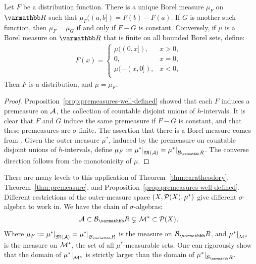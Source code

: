    \begin{theorem}
        Let $F$ be a distribution function. There is a unique Borel measure $\mu_F$ on $\bfR$ such that $\mu_F((a,b]) = F(b) - F(a)$. If $G$ is another such function, then $\mu_F = \mu_G$ if and only if $F-G$ is constant. Conversely, if $\mu$ is a Borel measure on $\bfR$ that is finite on all bounded Borel sets, define:
            \begin{equation*}
            \begin{split}
                F(x) =
                \begin{cases}
                    \mu ( (0,x]), & x > 0, \\
                    0, & x = 0, \\
                    \mu ( -(x,0]), & x < 0, \\
                \end{cases}
            \end{split}
            \end{equation*}
        Then $F$ is a distribution, and $\mu = \mu_F$.
    \end{theorem}
        \begin{proof}
            Proposition~\ref{prop:premeasures-well-defined} showed that each $F$ induces a premeasure on $\mathcal{A}$, the collection of countable disjoint unions of $h$-intervals. It is clear that $F$ and $G$ induce the same premeasure if $F-G$ is constant, and that these premeasures are $\sigma$-finite. The assertion that there is a  Borel measure comes from . Given the outer measure $\mu^\ast$, induced by the premeasure on countable disjoint unions of $h$-intervals, define $\mu_F := \restr{\mu^\ast}{\fM(\cA)} = \restr{\mu^\ast}{\cB_\bfR}$. The converse direction follows from the monotonicity of $\mu$.
        \end{proof}

    There are many levels to this application of Theorem~\ref{thm:caratheodory}, Theorem~\ref{thm:premeasure}, and Proposition~\ref{prop:premeasures-well-defined}. Different restrictions of the outer-measure space $(X,\mathcal{P}(X),\mu^\ast)$ give different $\sigma$-algebra to work in. We have the chain of $\sigma$-algebras:
        \begin{equation*}
        \begin{split}
            \cA \subset \cB_\bfR \subsetneq \cM^\ast \subset \cP(X),
        \end{split}
        \end{equation*}
    Where $\mu_F := \restr{\mu^\ast}{\fM(\cA)} = \restr{\mu^\ast}{\cB_\bfR}$ is the measure on $\cB_\bfR$, and $\restr{\mu^\ast}{\cM^\ast}$ is the  measure on $\mathcal{M}^\ast$, the set of all $\mu^\ast$-measurable sets. One can rigorously show that the domain of $\restr{\mu^\ast}{\cM^\ast}$ is strictly larger than the domain of $\restr{\mu^\ast}{\cB_\bfR}$.

